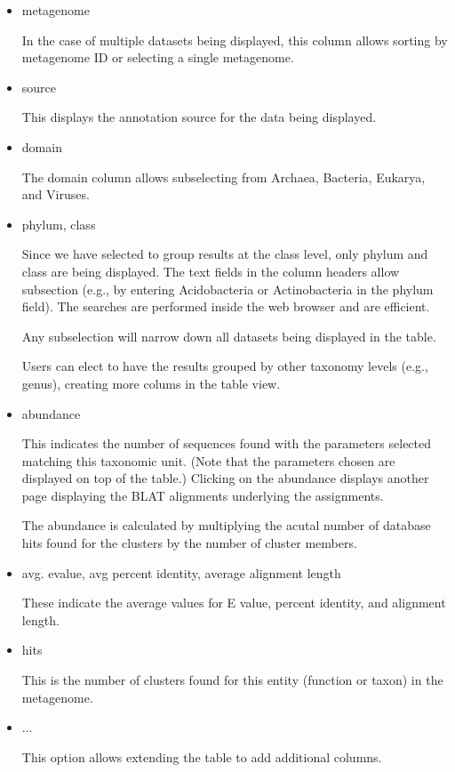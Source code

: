 \documentclass[12pt,fullpage]{report}
\begin{document}
\begin{itemize}
\item metagenome

In the case of multiple datasets being displayed, this column allows sorting by metagenome ID or selecting a single metagenome.

\item source

This displays the annotation source for the data being displayed.

\item domain

The domain column allows subselecting from Archaea, Bacteria, Eukarya, and Viruses.

\item phylum, class

Since we have selected to group results at the class level, only phylum and class are being displayed. The text fields in the column headers
allow subsection (e.g., by entering Acidobacteria or Actinobacteria in the phylum field). The searches are performed inside the web browser and are efficient.

Any subselection will narrow down all datasets being displayed in the table.

Users can elect to have the results grouped by other taxonomy levels (e.g., genus), creating more colums in the table view.

\item abundance

This indicates the number of sequences found with the parameters selected matching this taxonomic unit. (Note that the parameters chosen are displayed on top of the table.) Clicking on the abundance displays another page displaying the BLAT alignments underlying the assignments.

The abundance is calculated by multiplying the acutal number of database hits found for the clusters by the number of cluster members.

\item avg. evalue, avg percent identity, average alignment length

These indicate the average values for E  value, percent identity, and alignment length.

\item hits

This is the  number of clusters found for this entity (function or taxon) in the metagenome.

\item ...

This option allows extending the table to add additional columns.

\end{itemize}
\end{document}
